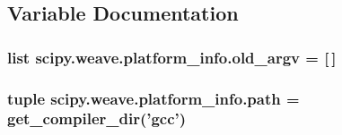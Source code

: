 \subsection{Variable Documentation}
\hypertarget{namespacescipy_1_1weave_1_1platform__info_a4ff2a9697146d5bf6efc011bec30017a}{}
\subsubsection[{old\+\_\+argv}]{\setlength{\rightskip}{0pt plus 5cm}list scipy.\+weave.\+platform\+\_\+info.\+old\+\_\+argv = \mbox{[}$\,$\mbox{]}}\label{namespacescipy_1_1weave_1_1platform__info_a4ff2a9697146d5bf6efc011bec30017a}
\hypertarget{namespacescipy_1_1weave_1_1platform__info_aa5ae33dd1f0756bd777a012b936b2df6}{}
\subsubsection[{path}]{\setlength{\rightskip}{0pt plus 5cm}tuple scipy.\+weave.\+platform\+\_\+info.\+path = {\bf get\+\_\+compiler\+\_\+dir}('gcc')}\label{namespacescipy_1_1weave_1_1platform__info_aa5ae33dd1f0756bd777a012b936b2df6}
